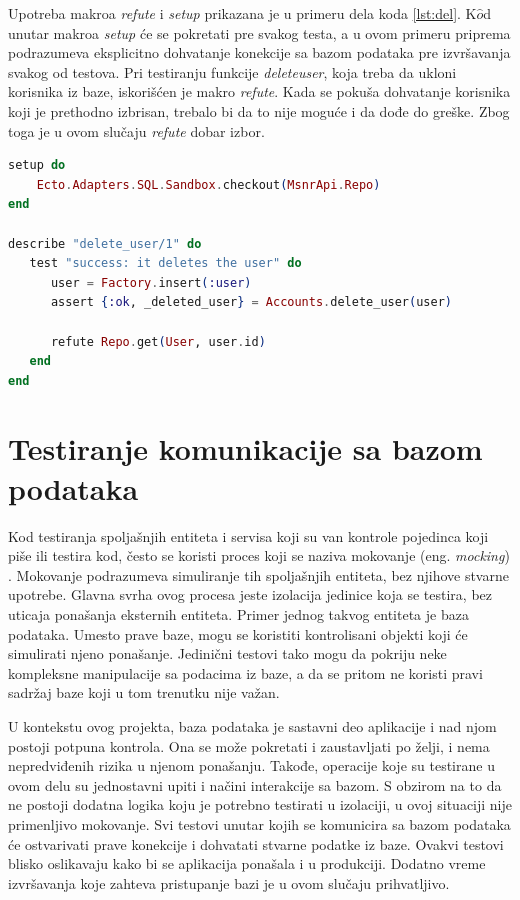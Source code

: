 \documentclass[12pt,oneside]{memoir}
\begin{document}
\par Upotreba makroa \emph{refute} i \emph{setup} prikazana je u primeru dela koda \ref{lst:del}. K$\hat{o}$d  unutar makroa \emph{setup} će se pokretati pre svakog testa, a u ovom primeru priprema podrazumeva eksplicitno dohvatanje konekcije sa bazom podataka pre izvršavanja svakog od testova. Pri testiranju funkcije \emph{delete{\textunderscore}user}, koja treba da ukloni korisnika iz baze, iskorišćen je makro \emph{refute}. Kada se pokuša dohvatanje korisnika koji je prethodno izbrisan, trebalo bi da to nije moguće i da dođe do greške. Zbog toga je u ovom slučaju \emph{refute} dobar izbor.
 
\begin{lstlisting}[language=elixir, caption={Upotreba makroa \emph{setup} i \emph{refute} na primeru funkcije \emph{delete{\textunderscore}user}},captionpos=b, label={lst:del}]
setup do
    Ecto.Adapters.SQL.Sandbox.checkout(MsnrApi.Repo)
end
  
describe "delete_user/1" do
   test "success: it deletes the user" do
      user = Factory.insert(:user)
      assert {:ok, _deleted_user} = Accounts.delete_user(user)

      refute Repo.get(User, user.id)
   end
end
\end{lstlisting}


\section{Testiranje komunikacije sa bazom podataka}
\label{sec:baza}

\par Kod testiranja spoljašnjih entiteta i servisa koji su van kontrole pojedinca koji piše ili testira kod, često se koristi proces koji se naziva mokovanje (eng. \emph{mocking}) \cite{external}. Mokovanje podrazumeva simuliranje tih spoljašnjih entiteta, bez njihove stvarne upotrebe. Glavna svrha ovog procesa jeste izolacija jedinice koja se testira, bez uticaja ponašanja eksternih entiteta. Primer jednog takvog entiteta je baza podataka. Umesto prave baze, mogu se koristiti kontrolisani objekti koji će simulirati njeno ponašanje. Jedinični testovi tako mogu da pokriju neke kompleksne manipulacije sa podacima iz baze, a da se pritom ne koristi pravi sadržaj baze koji u tom trenutku nije važan. 
\par U kontekstu ovog projekta, baza podataka je sastavni deo aplikacije i nad njom postoji potpuna kontrola. Ona se može pokretati i zaustavljati po želji, i nema nepredviđenih rizika u njenom ponašanju. Takođe, operacije koje su testirane u ovom delu su jednostavni upiti i načini interakcije sa bazom. S obzirom na to da ne postoji dodatna logika koju je potrebno testirati u izolaciji, u ovoj situaciji nije primenljivo mokovanje. Svi testovi unutar kojih se komunicira sa bazom podataka će ostvarivati prave konekcije i dohvatati stvarne podatke iz baze. Ovakvi testovi blisko oslikavaju kako bi se aplikacija ponašala i u produkciji. Dodatno vreme izvršavanja koje zahteva pristupanje bazi je u ovom slučaju prihvatljivo.
\end{document}
